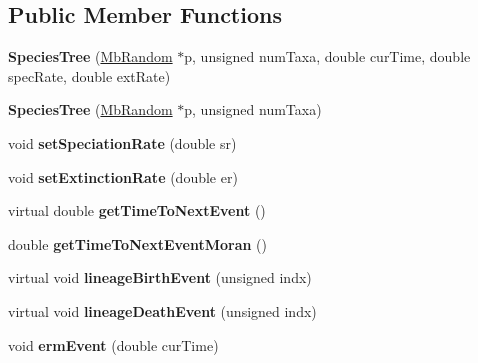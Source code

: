 \subsection*{Public Member Functions}
\begin{DoxyCompactItemize}
\item 
\mbox{\label{class_species_tree_a7fd5c3c36552ec14f8ef16ddeebb177f}} 
{\bfseries Species\+Tree} (\mbox{\hyperlink{class_mb_random}{Mb\+Random}} $\ast$p, unsigned num\+Taxa, double cur\+Time, double spec\+Rate, double ext\+Rate)
\item 
\mbox{\label{class_species_tree_aade16d74539d448009775e0987a6aa41}} 
{\bfseries Species\+Tree} (\mbox{\hyperlink{class_mb_random}{Mb\+Random}} $\ast$p, unsigned num\+Taxa)
\item 
\mbox{\label{class_species_tree_a9f1d99b8e8816c61c974416ffeee8e9c}} 
void {\bfseries set\+Speciation\+Rate} (double sr)
\item 
\mbox{\label{class_species_tree_ae376be8408ed64c45aac0e25e8cbf96f}} 
void {\bfseries set\+Extinction\+Rate} (double er)
\item 
\mbox{\label{class_species_tree_a56deafb42c0b687fbc74913b7753b17c}} 
virtual double {\bfseries get\+Time\+To\+Next\+Event} ()
\item 
\mbox{\label{class_species_tree_abcbedd95875af3092d6d686b52d441ab}} 
double {\bfseries get\+Time\+To\+Next\+Event\+Moran} ()
\item 
\mbox{\label{class_species_tree_a2f19666c08a685abe8d67163733995d3}} 
virtual void {\bfseries lineage\+Birth\+Event} (unsigned indx)
\item 
\mbox{\label{class_species_tree_ad7f06953774f19b5bcf4cda53d871332}} 
virtual void {\bfseries lineage\+Death\+Event} (unsigned indx)
\item 
\mbox{\label{class_species_tree_a3c1bdbd2d23157f31db83601da8656e0}} 
void {\bfseries erm\+Event} (double cur\+Time)
\item 
\mbox{\label{class_species_tree_ac24b2addd2cb8886b4132a108cd5f118}} 

\end{DoxyCompactItemize}
